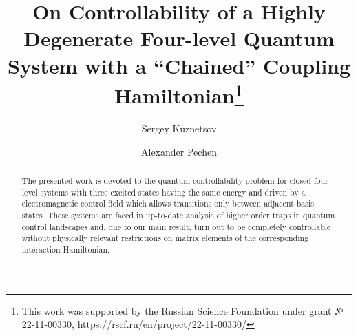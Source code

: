 \documentclass[12pt]{llncs}
\begin{document}
%
\fi

\title{On Controllability of a Highly Degenerate Four-level Quantum System with a ``Chained'' Coupling Hamiltonian\thanks{This work was supported by the Russian Science Foundation under grant № 22-11-00330, https://rscf.ru/en/project/22-11-00330/}}
\author{Sergey Kuznetsov 
  \and
  Alexander Pechen 
}

\maketitle

\begin{abstract}
The presented work is devoted to the quantum controllability problem for closed four-level systems with three excited states having the same energy and driven by a electromagnetic control field which allows transitions only between adjacent basis states. These systems are faced in up-to-date analysis of higher order traps in quantum control landscapes and, due to our main result, turn out to be completely controllable without physically relevant restrictions on matrix elements of the corresponding interaction Hamiltonian.

\end{abstract}

\end{document}

